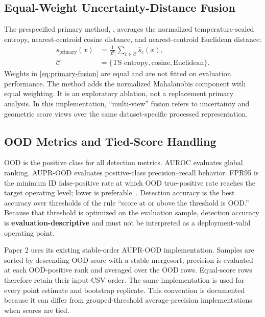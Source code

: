 \subsection{Equal-Weight Uncertainty-Distance Fusion}

The prespecified primary method, \primarymethod, averages the normalized temperature-scaled entropy, nearest-centroid cosine distance, and nearest-centroid Euclidean distance:
\begin{align}
  s_{\mathrm{primary}}(x)
  &= \frac{1}{\lvert\mathcal{C}\rvert}
  \sum_{c\in\mathcal{C}}\widehat{s}_c(x), \label{eq:primary-fusion}\\
  \mathcal{C}
  &= \{\text{TS entropy},\text{cosine},\text{Euclidean}\}.
  \nonumber
\end{align}
Weights in \eqref{eq:primary-fusion} are equal and are not fitted on evaluation performance. The method \exploratorymethod{} adds the normalized Mahalanobis component with equal weighting. It is an exploratory ablation, not a replacement primary analysis. In this implementation, \textquotedblleft{}multi-view\textquotedblright{} fusion refers to uncertainty and geometric score views over the same dataset-specific processed representation.

\subsection{OOD Metrics and Tied-Score Handling}

OOD is the positive class for all detection metrics. AUROC evaluates global ranking. AUPR-OOD evaluates positive-class precision--recall behavior. FPR95 is the minimum ID false-positive rate at which OOD true-positive rate reaches the target operating level; lower is preferable~\cite{hendrycks2017baseline,liang2018enhancing}. Detection accuracy is the best accuracy over thresholds of the rule \textquotedblleft{}score at or above the threshold is OOD.\textquotedblright{} Because that threshold is optimized on the evaluation sample, detection accuracy is \textbf{evaluation-descriptive} and must not be interpreted as a deployment-valid operating point.

Paper 2 uses its existing stable-order AUPR-OOD implementation. Samples are sorted by descending OOD score with a stable mergesort; precision is evaluated at each OOD-positive rank and averaged over the OOD rows. Equal-score rows therefore retain their input-CSV order. The same implementation is used for every point estimate and bootstrap replicate. This convention is documented because it can differ from grouped-threshold average-precision implementations when scores are tied.

